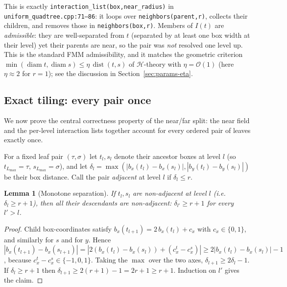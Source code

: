 \documentclass[11pt,a4paper]{article}
\newcommand{\Order}{\mathcal{O}}
\newcommand{\abs}[1]{\left\lvert #1 \right\rvert}
\newcommand{\Hmat}{\mathcal{H}}
\newcommand{\code}[1]{\texttt{#1}}
\newtheorem{lemma}{Lemma}
\theoremstyle{definition}
\theoremstyle{remark}
\begin{document}
This is exactly \code{interaction\_list(box,near\_radius)} in
\code{uniform\_quadtree.cpp:71--86}: it loops over \code{neighbors(parent,r)},
collects their children, and removes those in \code{neighbors(box,r)}. Members of
$I(t)$ are \emph{admissible}: they are well-separated from $t$ (separated by at
least one box width at their level) yet their parents are near, so the pair was
\emph{not} resolved one level up. This is the standard FMM admissibility, and it
matches the geometric criterion
$\min(\operatorname{diam} t,\operatorname{diam} s)\le \eta\,\operatorname{dist}(t,s)$
of $\Hmat$-theory with $\eta=\Order(1)$ (here $\eta\approx 2$ for $r=1$); see the
discussion in Section~\ref{sec:params-eta}.

\subsection{Exact tiling: every pair once}
\label{sec:tiling}

We now prove the central correctness property of the near/far split: the near
field and the per-level interaction lists together account for every ordered
pair of leaves exactly once.

For a fixed leaf pair $(\tau,\sigma)$ let $t_l,s_l$ denote their ancestor boxes
at level $l$ (so $t_{L_{\max}}=\tau$, $s_{L_{\max}}=\sigma$), and let
$\delta_l=\max(\abs{b_x(t_l)-b_x(s_l)},\abs{b_y(t_l)-b_y(s_l)})$ be their box
distance. Call the pair \emph{adjacent} at level $l$ if $\delta_l\le r$.

\begin{lemma}[Monotone separation]
\label{lem:monotone}
If $t_l,s_l$ are non-adjacent at level $l$ (i.e.\ $\delta_l\ge r+1$), then all
their descendants are non-adjacent: $\delta_{l'}\ge r+1$ for every $l'>l$.
\end{lemma}
\begin{proof}
Child box-coordinates satisfy $b_x(t_{l+1})=2\,b_x(t_l)+c_x$ with
$c_x\in\{0,1\}$, and similarly for $s$ and for $y$. Hence
$\abs{b_x(t_{l+1})-b_x(s_{l+1})} = \abs{2(b_x(t_l)-b_x(s_l))+(c_x^t-c_x^s)}
\ge 2\abs{b_x(t_l)-b_x(s_l)} - 1$, because $c_x^t-c_x^s\in\{-1,0,1\}$. Taking the
$\max$ over the two axes, $\delta_{l+1}\ge 2\delta_l-1$. If $\delta_l\ge r+1$
then $\delta_{l+1}\ge 2(r+1)-1 = 2r+1\ge r+1$. Induction on $l'$ gives the claim.
\end{proof}
\end{document}
